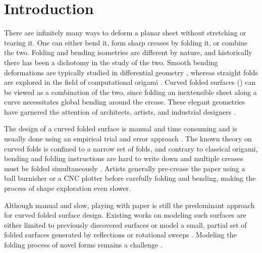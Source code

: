 

\section{Introduction}
There are infinitely many ways to deform a planar sheet without stretching or tearing it. One can either bend it, form sharp creases by folding it, or combine the two. Folding and bending isometries are different by nature, and historically there has been a dichotomy in the study of the two. Smooth bending deformations are typically studied in differential geometry \cite{do_carmo}, whereas straight folds are  explored in the field of computational origami \cite{origami_book}. Curved folded surfaces \cite{huffman} () can be viewed as a combination of the two, since folding an inextensible sheet along a curve necessitates global bending around the crease. These elegant geometries have garnered the attention of architects, artists, and industrial designers \cite{arch_geom,tachi2013composite,tachi2011one,buri2011curved,robofold,curved_review}.

The design of a curved folded surface is manual and time consuming and is usually done using an empirical trial and error approach \cite{curved_review,huffmann_reconstructing}. The known theory on curved folds is confined to a narrow set of folds, and contrary to classical origami, bending and folding instructions are hard to write down and multiple creases must be folded simultaneously \cite{StringActuated:2017}. Artists generally pre-crease the paper using a ball burnisher or a CNC plotter before carefully folding and bending, making the process of shape exploration even slower. 

Although manual and slow, playing with paper is still the predominant approach for curved folded surface design. Existing works on modeling such surfaces are either limited to previously discovered surfaces \cite{curved_folding_kilian,StringActuated:2017} or model a small, partial set of folded surfaces generated by reflections or rotational sweeps \cite{Mitani_ref,mitani2009design}. Modeling the folding process of novel forms remains a challenge \cite{curved_review}. 

